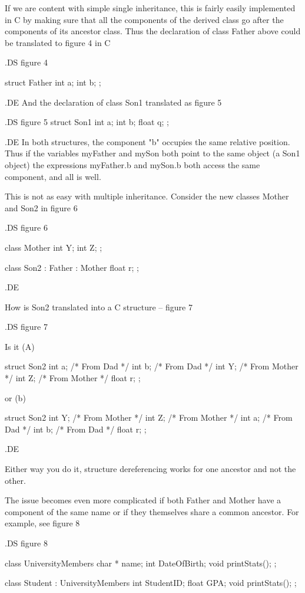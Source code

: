 If we are content with simple single inheritance, this is fairly easily
implemented in C by making sure that all the components of the
derived class go after the components of its ancestor class.
Thus the declaration of class Father above could be translated
to figure 4 in C

.DS
figure 4

struct Father
    {	int	a;
	int	b;
    }	;

.DE
And the declaration of class Son1 translated as figure 5

.DS
figure 5
struct Son1
    {	int	a;
	int	b;
	float	q;
    }	;

.DE
In both structures, the component "b" occupies the same relative position.
Thus if the variables myFather and mySon both point to the same object
(a Son1 object) the expressions myFather.b and mySon.b both access the same
component, and all is well.

This is not as easy with multiple inheritance.  Consider the 
new classes Mother and Son2 in figure 6

.DS
figure 6

class Mother
    {
	int	Y;
	int	Z;
    }	;


class Son2 : Father : Mother
    {
	float	r;
    }	;

.DE

How is Son2 translated into a C structure -- figure 7

.DS
figure 7


Is it (A)

struct Son2
    {
	int	a;	/* From Dad */
	int	b;	/* From Dad */
	int	Y;	/* From Mother */
	int	Z;	/* From Mother */
	float	r;
    }	;

or (b)

struct Son2
    {
	int	Y;	/* From Mother */
	int	Z;	/* From Mother */
	int	a;	/* From Dad */
	int	b;	/* From Dad */
	float	r;
    }	;

.DE

Either way you do it, structure dereferencing works for one ancestor and not
the other.


The issue becomes even more complicated if both Father and Mother
have a component of the same name or if they themselves share a common
ancestor.  For example, see figure 8  

.DS
figure 8  


class UniversityMembers
    {
	char *	name;
	int	DateOfBirth;
	void	printStats();
    }	;

class Student : UniversityMembers
    {
	int	StudentID;
   	float	GPA;
	void	printStats();
    }	;

